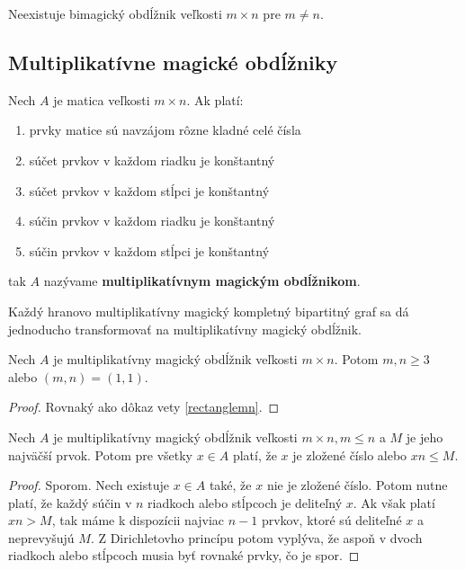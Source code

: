 \begin{hypothesis} Neexistuje bimagický obdĺžnik veľkosti $m \times n$ pre $m \neq n$.
\end{hypothesis}



\subsection{Multiplikatívne magické obdĺžniky}

\begin{definition} Nech $A$ je matica veľkosti $m \times n$. Ak platí:

\begin{enumerate}
\item prvky matice sú navzájom rôzne kladné celé čísla
\item súčet prvkov v každom riadku je konštantný
\item súčet prvkov v každom stĺpci je konštantný
\item súčin prvkov v každom riadku je konštantný
\item súčin prvkov v každom stĺpci je konštantný
\end{enumerate}

tak $A$ nazývame \textbf{multiplikatívnym magickým obdĺžnikom}.
\end{definition} 

Každý hranovo multiplikatívny magický kompletný bipartitný graf sa dá jednoducho transformovať na multiplikatívny magický obdĺžnik. \\

\begin{theorem} Nech $A$ je multiplikatívny magický obdĺžnik veľkosti $m \times n$. Potom $m,n \geq 3$ alebo $(m, n) = (1, 1)$.
\end{theorem}

\begin{proof} Rovnaký ako dôkaz vety \ref{rectanglemn}.
\end{proof}

\begin{theorem}
\label{rectanglemax}
Nech $A$ je multiplikatívny magický obdĺžnik veľkosti $m \times n, m \leq n$ a $M$ je jeho najväčší prvok. Potom pre všetky $x \in A$ platí, že $x$ je zložené číslo alebo $xn \leq M$.
\end{theorem}

\begin{proof} Sporom. Nech existuje $x \in A$ také, že $x$ nie je zložené číslo. Potom nutne platí, že každý súčin v $n$ riadkoch alebo stĺpcoch je deliteľný $x$. Ak však platí $xn > M$, tak máme k dispozícii najviac $n-1$ prvkov, ktoré sú deliteľné $x$ a neprevyšujú $M$. Z Dirichletovho princípu potom vyplýva, že aspoň v dvoch riadkoch alebo stĺpcoch musia byť rovnaké prvky, čo je spor.
\end{proof}

